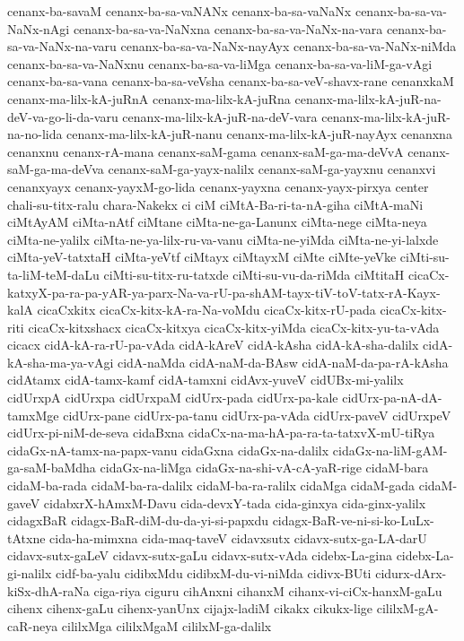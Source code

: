 {cenanx-ba-savaM
cenanx-ba-sa-vaNANx
cenanx-ba-sa-vaNaNx
cenanx-ba-sa-va-NaNx-nAgi
cenanx-ba-sa-va-NaNxna
cenanx-ba-sa-va-NaNx-na-vara
cenanx-ba-sa-va-NaNx-na-varu
cenanx-ba-sa-va-NaNx-nayAyx
cenanx-ba-sa-va-NaNx-niMda
cenanx-ba-sa-va-NaNxnu
cenanx-ba-sa-va-liMga
cenanx-ba-sa-va-liM-ga-vAgi
cenanx-ba-sa-vana
cenanx-ba-sa-veVsha
cenanx-ba-sa-veV-shavx-rane
cenanxkaM
cenanx-ma-lilx-kA-juRnA
cenanx-ma-lilx-kA-juRna
cenanx-ma-lilx-kA-juR-na-deV-va-go-li-da-varu
cenanx-ma-lilx-kA-juR-na-deV-vara
cenanx-ma-lilx-kA-juR-na-no-lida
cenanx-ma-lilx-kA-juR-nanu
cenanx-ma-lilx-kA-juR-nayAyx
cenanxna
cenanxnu
cenanx-rA-mana
cenanx-saM-gama
cenanx-saM-ga-ma-deVvA
cenanx-saM-ga-ma-deVva
cenanx-saM-ga-yayx-nalilx
cenanx-saM-ga-yayxnu
cenanxvi
cenanxyayx
cenanx-yayxM-go-lida
cenanx-yayxna
cenanx-yayx-pirxya
center
chali-su-titx-ralu
chara-Nakekx
ci
ciM
ciMtA-Ba-ri-ta-nA-giha
ciMtA-maNi
ciMtAyAM
ciMta-nAtf
ciMtane
ciMta-ne-ga-Lanunx
ciMta-nege
ciMta-neya
ciMta-ne-yalilx
ciMta-ne-ya-lilx-ru-va-vanu
ciMta-ne-yiMda
ciMta-ne-yi-lalxde
ciMta-yeV-tatxtaH
ciMta-yeVtf
ciMtayx
ciMtayxM
ciMte
ciMte-yeVke
ciMti-su-ta-liM-teM-daLu
ciMti-su-titx-ru-tatxde
ciMti-su-vu-da-riMda
ciMtitaH
cicaCx-katxyX-pa-ra-pa-yAR-ya-parx-Na-va-rU-pa-shAM-tayx-tiV-toV-tatx-rA-Kayx-kalA
cicaCxkitx
cicaCx-kitx-kA-ra-Na-voMdu
cicaCx-kitx-rU-pada
cicaCx-kitx-riti
cicaCx-kitxshacx
cicaCx-kitxya
cicaCx-kitx-yiMda
cicaCx-kitx-yu-ta-vAda
cicacx
cidA-kA-ra-rU-pa-vAda
cidA-kAreV
cidA-kAsha
cidA-kA-sha-dalilx
cidA-kA-sha-ma-ya-vAgi
cidA-naMda
cidA-naM-da-BAsw
cidA-naM-da-pa-rA-kAsha
cidAtamx
cidA-tamx-kamf
cidA-tamxni
cidAvx-yuveV
cidUBx-mi-yalilx
cidUrxpA
cidUrxpa
cidUrxpaM
cidUrx-pada
cidUrx-pa-kale
cidUrx-pa-nA-dA-tamxMge
cidUrx-pane
cidUrx-pa-tanu
cidUrx-pa-vAda
cidUrx-paveV
cidUrxpeV
cidUrx-pi-niM-de-seva
cidaBxna
cidaCx-na-ma-hA-pa-ra-ta-tatxvX-mU-tiRya
cidaGx-nA-tamx-na-papx-vanu
cidaGxna
cidaGx-na-dalilx
cidaGx-na-liM-gAM-ga-saM-baMdha
cidaGx-na-liMga
cidaGx-na-shi-vA-cA-yaR-rige
cidaM-bara
cidaM-ba-rada
cidaM-ba-ra-dalilx
cidaM-ba-ra-ralilx
cidaMga
cidaM-gada
cidaM-gaveV
cidabxrX-hAmxM-Davu
cida-devxY-tada
cida-ginxya
cida-ginx-yalilx
cidagxBaR
cidagx-BaR-diM-du-da-yi-si-papxdu
cidagx-BaR-ve-ni-si-ko-LuLx-tAtxne
cida-ha-mimxna
cida-maq-taveV
cidavxsutx
cidavx-sutx-ga-LA-darU
cidavx-sutx-gaLeV
cidavx-sutx-gaLu
cidavx-sutx-vAda
cidebx-La-gina
cidebx-La-gi-nalilx
cidf-ba-yalu
cidibxMdu
cidibxM-du-vi-niMda
cidivx-BUti
cidurx-dArx-kiSx-dhA-raNa
ciga-riya
ciguru
cihAnxni
cihanxM
cihanx-vi-ciCx-hanxM-gaLu
cihenx
cihenx-gaLu
cihenx-yanUnx
cijajx-ladiM
cikakx
cikukx-lige
cililxM-gA-caR-neya
cililxMga
cililxMgaM
cililxM-ga-dalilx
}
